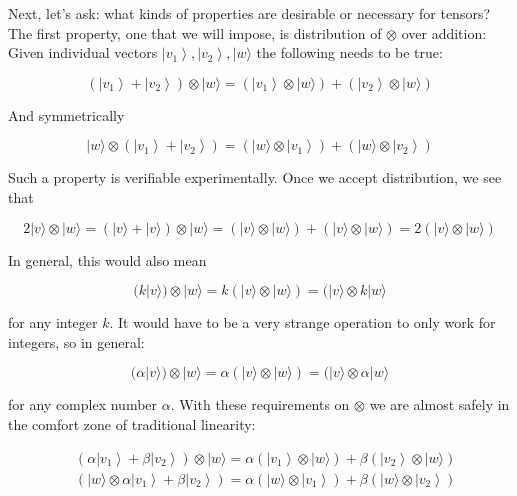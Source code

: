 \documentclass[main.tex]{subfiles}
\begin{document}
    Next, let's ask: what kinds of properties are desirable or necessary for tensors? The first property, one that we will impose, is distribution of $\otimes$ over addition: Given individual vectors $\left|v_{1}\right\rangle,\left|v_{2}\right\rangle,|w\rangle$ the following needs to be true:
    
    $$
    \left(\left|v_{1}\right\rangle+\left|v_{2}\right\rangle\right) \otimes|w\rangle=\left(\left|v_{1}\right\rangle \otimes|w\rangle\right)+\left(\left|v_{2}\right\rangle \otimes|w\rangle\right)
    $$
    
    And symmetrically
   
    $$
    |w\rangle \otimes\left(\left|v_{1}\right\rangle+\left|v_{2}\right\rangle\right)=\left(|w\rangle \otimes\left|v_{1}\right\rangle\right)+\left(|w\rangle \otimes\left|v_{2}\right\rangle\right)
    $$
    
    Such a property is verifiable experimentally. Once we accept distribution, we see that
    
    $$
    2|v\rangle \otimes|w\rangle=(|v\rangle+|v\rangle) \otimes|w\rangle=(|v\rangle \otimes|w\rangle)+(|v\rangle \otimes|w\rangle)=2(|v\rangle \otimes|w\rangle)
    $$
    
    In general, this would also mean
    
    $$
    (k|v\rangle) \otimes|w\rangle=k(|v\rangle \otimes|w\rangle)=(|v\rangle \otimes k|w\rangle
    $$
    
    for any integer $k$. It would have to be a very strange operation to only work for integers, so in general:
    
    $$
    (\alpha|v\rangle) \otimes|w\rangle=\alpha(|v\rangle \otimes|w\rangle)=(|v\rangle \otimes \alpha|w\rangle
    $$
    
    for any complex number $\alpha$. With these requirements on $\otimes$ we are almost safely in the comfort zone of traditional linearity:
    
    $$
    \begin{aligned}
    &\left(\alpha\left|v_{1}\right\rangle+\beta\left|v_{2}\right\rangle\right) \otimes|w\rangle=\alpha\left(\left|v_{1}\right\rangle \otimes|w\rangle\right)+\beta\left(\left|v_{2}\right\rangle \otimes|w\rangle\right) \\
    &\left(|w\rangle \otimes \alpha\left|v_{1}\right\rangle+\beta\left|v_{2}\right\rangle\right)=\alpha\left(|w\rangle \otimes\left|v_{1}\right\rangle\right)+\beta\left(|w\rangle \otimes\left|v_{2}\right\rangle\right)
    \end{aligned}
    $$
    
\end{document}
